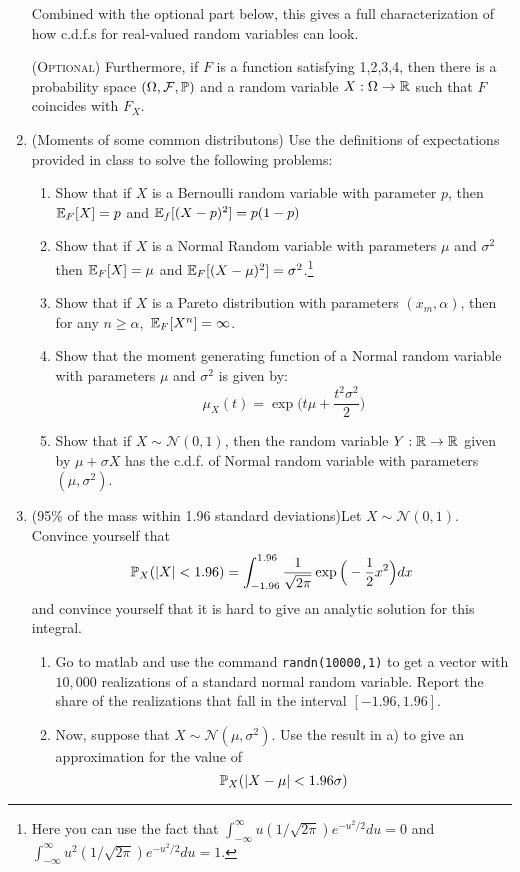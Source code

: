\documentclass[11pt]{article} %
\begin{document}
\begin{enumerate}
 Combined with the optional part below, this gives a full characterization of how c.d.f.s for real-valued random variables can look.

\noindent ({\scshape Optional}) Furthermore, if $F$ is a function satisfying 1,2,3,4, then there is a probability space $(\Omega, \mathcal{F}, \mathbb{P})$ and a random variable $X: \Omega \rightarrow \mathbb{R}$ such that $F$ coincides with $F_{X}$. 

\item (Moments of some common distributons) Use the definitions of expectations provided in class to solve the following problems:
\begin{enumerate}
\item Show that if $X$ is a Bernoulli random variable with parameter $p$, then $\mathbb{E}_{F}[X]=p$ and $\mathbb{E}_{f}[(X-p)^2]=p(1-p)$
\item Show that if $X$ is a Normal Random variable with parameters $\mu$ and $\sigma^2$ then $\mathbb{E}_{F}[X]=\mu$ and $\mathbb{E}_{F}[(X-\mu)^2]=\sigma^2$.\footnote{Here you can use the fact that $\int_{-\infty}^{\infty} u (1/\sqrt{2 \pi}) e^{-u^2/2} du =0$ and $\int_{-\infty}^{\infty} u^2 (1/\sqrt{2 \pi}) e^{-u^2/2} du =1$.} 
\item Show that if $X$ is a Pareto distribution with parameters $(x_m, \alpha)$, then for any $n \geq \alpha,$ $\mathbb{E}_{F}[X^{n}]=\infty$. 
\item Show that the moment generating function of a Normal random variable with parameters $\mu$ and $\sigma^2$ is given by:
$$\mu_{X}(t)= \exp \Big( t \mu + \frac{t^2 \sigma^2}{2}  \Big)  $$

\item Show that if $X \sim \mathcal{N}(0,1)$, then the random variable $Y:\mathbb{R} \rightarrow \mathbb{R}$ given by $\mu + \sigma X$ has the c.d.f. of Normal random variable with parameters $(\mu, \sigma^2)$. 

\end{enumerate}

\item (95\% of the mass within 1.96 standard deviations)Let $X \sim \mathcal{N}(0,1)$. Convince yourself that 
$$\mathbb{P}_{X}(|X|<1.96) = \int_{-1.96}^{1.96} \frac{1}{\sqrt{2\pi}} \exp\Big( -\frac{1}{2}x^2 \Big)dx $$
\noindent and convince yourself that it is hard to give an analytic solution for this integral. 
\begin{enumerate}[a]
\item Go to matlab and use the command \texttt{randn(10000,1)} to get a vector with $10,000$ realizations of a standard normal random variable.   Report the share of the realizations that fall in the interval $[-1.96,1.96]$. 
\item Now, suppose that $X \sim \mathcal{N}(\mu,\sigma^2)$. Use the result in a) to give an approximation for the value of 
$$ \mathbb{P}_{X}(|X-\mu|< 1.96 \sigma) $$ 
\end{enumerate}

\end{enumerate}

\newpage



\end{document}
